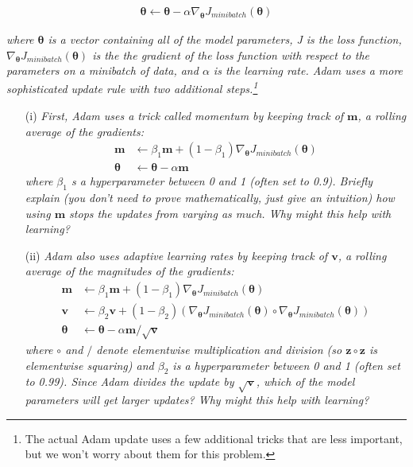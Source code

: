 \documentclass[fleqn]{MJD}
\newcommand{\0}{\emptyset}
\begin{document}
\begin{align}
	\bm{\theta} \leftarrow \bm{\theta} - \alpha \nabla_{\bm{\theta}} J_{minibatch}(\bm{\theta})
\end{align}

\noindent \textit{where $\bm{\theta}$ is a vector  containing all of the model parameters, J is the loss function, $\nabla_{\bm{\theta}} J_{minibatch}(\bm{\theta})$ is the the gradient of the loss function with respect to the parameters on a minibatch of data, and $\alpha$ is the learning rate. Adam uses a more sophisticated update rule with two additional steps.\footnote{The actual Adam update uses a few additional tricks that are less important, but we won’t worry about them for this problem.}} \\

\begin{enumerate}
	\item[(i)] \textit{First, Adam uses a trick called momentum by keeping track of $\bm{m}$, a rolling average of the 	gradients:}
	\begin{align}
		\bm{m} &\leftarrow \beta_{1}\bm{m} + (1 - \beta_{1}) \nabla_{\bm{\theta}} J_{minibatch}(\bm{\theta})\\
		\bm{\theta} &\leftarrow \bm{\theta} - \alpha\bm{m}
	\end{align}
	\textit{where $\beta_{1}$ s a hyperparameter between 0 and 1 (often set to 0.9). Briefly explain (you don’t need to prove mathematically, just give an intuition) how using $\bm{m}$ stops the updates from varying as much. Why might this help with learning?}
	\item[(ii)] \textit{Adam also uses adaptive learning rates by keeping track of $\bm{v}$, a rolling average of the magnitudes of the gradients:}
	\begin{align}
			\bm{m} &\leftarrow \beta_{1}\bm{m} + (1 - \beta_{1}) \nabla_{\bm{\theta}} J_{minibatch}(\bm{\theta})\\
			\bm{v} &\leftarrow \beta_{2}\bm{v} + (1 - \beta_{2})( \nabla_{\bm{\theta}} J_{minibatch}(\bm{\theta}) \circ \nabla_{\bm{\theta}} J_{minibatch}(\bm{\theta})) \\
			\bm{\theta} &\leftarrow \bm{\theta} - \alpha\bm{m} / \sqrt{\bm{v}}
	\end{align}
	\textit{where $\circ$ and $/$ denote elementwise multiplication and division (so $\bm{z} \circ \bm{z}$ is elementwise squaring) and $\beta_{2}$ is a hyperparameter between 0 and 1 (often set to 0.99). Since Adam divides the update by $\sqrt{\bm{v}}$, which of the model parameters will get larger updates? Why might this help with learning?}
\end{enumerate}
\end{document}
